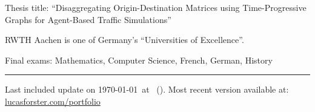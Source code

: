 \documentclass[12pt,a4paper,ragged2e,withhyper]{altacv} %
\begin{document}
\begin{paracol}{2}
\medskip


Thesis title:
``Disaggregating Origin-Destination Matrices
using Time-Progressive Graphs for Agent-Based Traffic Simulations''

\smallskip

RWTH Aachen is one of Germany's ``Universities of Excellence''.



\divider


Final exams: Mathematics, Computer Science, French, German, History

\end{paracol}

\vfill
\hrule
\medskip
\small{
    Last included update on \today~at \DTMcurrenttime~(\DTMcurrentzone).
    Most recent version available at: \url{lucasforster.com/portfolio}
}
\end{document}
